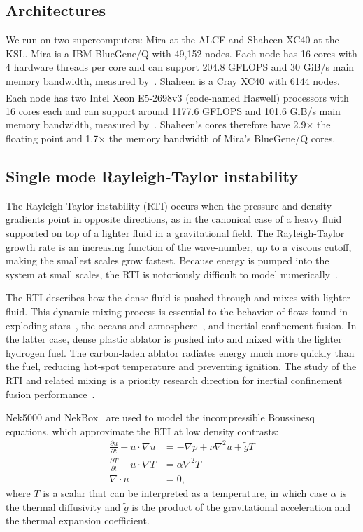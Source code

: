 \subsection{Architectures} 

We run on two supercomputers: Mira at the ALCF and Shaheen XC40 at the KSL.
Mira is a IBM BlueGene/Q with 49,152 nodes.
Each node has 16 cores with 4 hardware threads per core and can support 204.8
GFLOPS and 30 GiB/s main memory bandwidth, measured by~\cite{McCalpin2007}.
Shaheen is a Cray XC40 with 6144 nodes.
Each node has two Intel\textsuperscript{\textregistered}
Xeon\textsuperscript{\textregistered} E5-2698v3 (code-named Haswell) processors
with 16 cores each and can support around 1177.6 GFLOPS and 101.6 GiB/s main memory bandwidth, measured by~\cite{McCalpin2007}.
Shaheen's cores therefore have 2.9$\times$ the floating point and 1.7$\times$ the memory bandwidth of Mira's BlueGene/Q cores.

\subsection{Single mode Rayleigh-Taylor instability}

The Rayleigh-Taylor instability (RTI) occurs when the pressure and density gradients point in opposite directions, as in the canonical case of a heavy fluid supported on top of a lighter fluid in a gravitational field.
The Rayleigh-Taylor growth rate is an increasing function of the wave-number, up to a viscous cutoff, making the smallest scales grow fastest.
Because energy is pumped into the system at small scales, the RTI is notoriously difficult to model numerically~\cite{Dimonte2004}.

The RTI describes how the dense fluid is pushed through and mixes with lighter fluid.
This dynamic mixing process is essential to the behavior of flows found in exploding stars~\cite{Bell2004}, the oceans and atmosphere~\cite{Linden1973}, and inertial confinement fusion.
In the latter case, dense plastic ablator is pushed into and mixed with the lighter hydrogen fuel.
The carbon-laden ablator radiates energy much more quickly than the fuel, reducing hot-spot temperature and preventing ignition.
The study of the RTI and related mixing is a priority research direction for inertial confinement fusion performance~\cite{Gocharov2012}.

Nek5000 and NekBox~\cite{NekBox} are used to model the incompressible Boussinesq equations, which approximate the RTI at low density contrasts:
\begin{align}
\frac{\partial u}{\partial t} + u \cdot \nabla u &= - \nabla p + \nu \nabla^2 u + \tilde{g} T \\
\frac{\partial T}{\partial t} + u \cdot \nabla T &= \alpha \nabla^2 T \\
\nabla \cdot u &= 0,
\end{align}
where $T$ is a scalar that can be interpreted as a temperature, 
in which case $\alpha$ is the thermal diffusivity 
and $\tilde{g}$ is the product of the gravitational acceleration and the thermal expansion coefficient.

